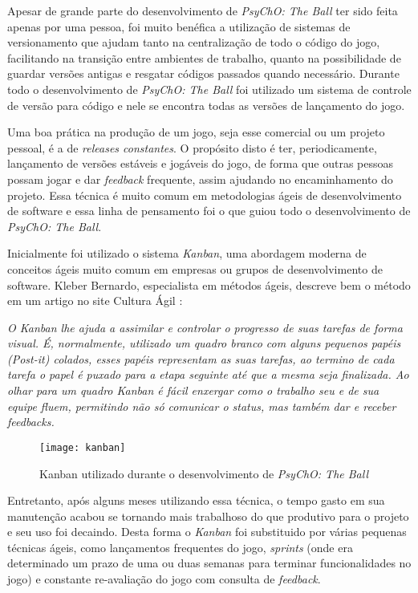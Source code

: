 Apesar de grande parte do desenvolvimento de \textit{PsyChO: The Ball} ter sido feita apenas por uma pessoa, foi muito benéfica a utilização de sistemas de versionamento que ajudam tanto na centralização de todo o código do jogo, facilitando na transição entre ambientes de trabalho, quanto na possibilidade de guardar versões antigas e resgatar códigos passados quando necessário. Durante todo o desenvolvimento de \textit{PsyChO: The Ball} foi utilizado um sistema de controle de versão para código e nele se encontra todas as versões de lançamento do jogo.

Uma boa prática na produção de um jogo, seja esse comercial ou um projeto pessoal, é a de \textit{releases constantes}. O propósito disto é ter, periodicamente, lançamento de versões estáveis e jogáveis do jogo, de forma que outras pessoas possam jogar e dar \textit{feedback} frequente, assim ajudando no encaminhamento do projeto. Essa técnica é muito comum em metodologias ágeis de desenvolvimento de software e essa linha de pensamento foi o que guiou todo o desenvolvimento de \textit{PsyChO: The Ball}.

Inicialmente foi utilizado o sistema \textit{Kanban}, uma abordagem moderna de conceitos ágeis muito comum em empresas ou grupos de desenvolvimento de software. Kleber Bernardo, especialista em métodos ágeis, descreve bem o método em um artigo no site Cultura Ágil \cite{kleberkanban}:

\begin{displayquote}
  \textit{O Kanban lhe ajuda a assimilar e controlar o progresso de suas tarefas de forma visual. É, normalmente, utilizado um quadro branco com alguns pequenos papéis (Post-it) colados, esses papéis representam as suas tarefas, ao termino de cada tarefa o papel é puxado para a etapa seguinte até que a mesma seja finalizada. Ao olhar para um quadro Kanban é fácil enxergar como o trabalho seu e de sua equipe fluem, permitindo não só comunicar o status, mas também dar e receber feedbacks.}
\end{displayquote}

\begin{figure}[h!]
\texttt{[image: kanban]}
\centering
\caption{Kanban utilizado durante o desenvolvimento de \textit{PsyChO: The Ball}}
\end{figure}

Entretanto, após alguns meses utilizando essa técnica, o tempo gasto em sua manutenção acabou se tornando mais trabalhoso do que produtivo para o projeto e seu uso foi decaindo. Desta forma o \textit{Kanban} foi substituido por várias pequenas técnicas ágeis, como lançamentos frequentes do jogo, \textit{sprints} (onde era determinado um prazo de uma ou duas semanas para terminar funcionalidades no jogo) e constante re-avaliação do jogo com consulta de \textit{feedback}.

